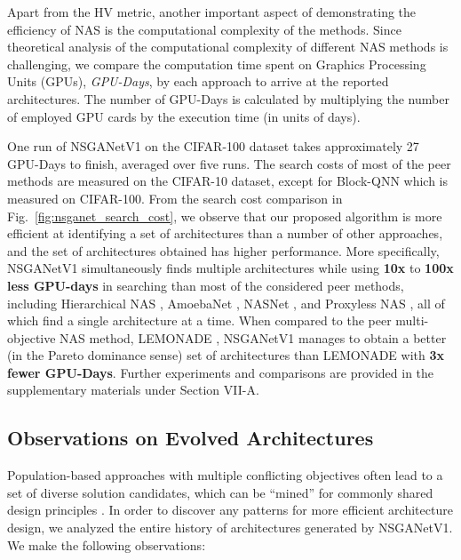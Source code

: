 \documentclass[journal]{IEEEtran}
\def\ourmethod{NSGANetV1}
\theoremstyle{definition}
\theoremstyle{remark}
\begin{document}
Apart from the HV metric, another important aspect of demonstrating the efficiency of NAS is the computational complexity of the methods. Since theoretical analysis of the computational complexity of different NAS methods is challenging, we compare the computation time spent on Graphics Processing Units (GPUs), \emph{GPU-Days}, by each approach to arrive at the reported architectures. The number of GPU-Days is calculated by multiplying the number of employed GPU cards by the execution time (in units of days).

One run of \ourmethod{} on the CIFAR-100 dataset takes approximately 27 GPU-Days to finish, averaged over five runs. The search costs of most of the peer methods are measured on the CIFAR-10 dataset, except for Block-QNN \cite{zhong2017blockqnn} which is measured on CIFAR-100. From the search cost comparison in Fig.~\ref{fig:nsganet_search_cost}, we observe that our proposed algorithm is more efficient at identifying a set of architectures than a number of other approaches, and the set of architectures obtained has higher performance. More specifically, \ourmethod{} simultaneously finds multiple architectures while using {\textbf{10x} to \textbf{100x less GPU-days}} in searching than most of the considered peer methods, including Hierarchical NAS \cite{liu2018hierarchical}, AmoebaNet \cite{real2019regularized}, NASNet \cite{nasnet2018}, and Proxyless NAS \cite{cai2018proxylessnas}, all of which find a single architecture at a time. When compared to the peer multi-objective NAS method, LEMONADE \cite{elsken2018efficient}, \ourmethod{} manages to obtain a better (in the Pareto dominance sense) set of architectures than LEMONADE with {\textbf{3x fewer GPU-Days}}. Further experiments and comparisons are provided in the supplementary materials under Section VII-A.

\vspace{-2mm}
\subsection{Observations on Evolved Architectures}
Population-based approaches with multiple conflicting objectives often lead to a set of diverse solution candidates, which can be ``mined'' for commonly shared design principles \cite{deb2006innovization}. In order to discover any patterns for more efficient architecture design, we analyzed the entire history of architectures generated by \ourmethod{}. We make the following observations:
\end{document}
